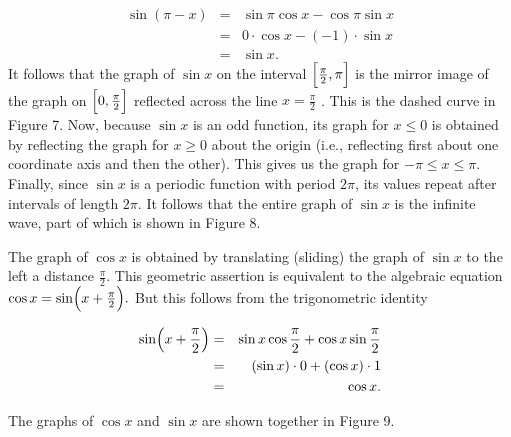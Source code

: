 \begin{eqnarray*}
\sin(\pi - x) &=& \sin \pi \cos x - \cos \pi \sin x \\
&=& 0 \cdot \cos x - (-1) \cdot \sin x \\
&=& \sin x.
\end{eqnarray*}
\noindent It follows that the graph of $\sin x$ on the interval $\Bigl[\frac{\pi}{2}, \pi \Bigr]$ is the mirror image of the graph on $\Bigl[0, \frac{\pi}{2} \Bigr]$ reflected across the line $x = \frac{\pi}{2}$ . This is the dashed curve in Figure 7. Now, because $\sin x$ is an odd function, its graph for $x \leq 0$ is obtained by reflecting the graph for $x \geq 0$ about the origin (i.e., reflecting first about one coordinate axis and then the other). This gives us the graph for $-\pi \leq x \leq \pi$.  Finally, since $\sin x$ is a periodic function with period $2\pi$, its values repeat after intervals of length $2\pi$. It follows that the entire graph of $\sin x$ is the infinite wave, part of which is shown in Figure 8.


The graph of $\cos x$ is obtained by translating (sliding) the graph of $\sin x$ to the left a distance $\frac{\pi}{2}$. This geometric assertion is equivalent to the algebraic equation $\cos x = \sin \Bigl(x + \frac{\pi}{2} \Bigr).$  But this follows from the trigonometric identity 

\begin{eqnarray*}
\sin \Bigl(x + \frac{\pi}{2} \Bigr) &=& \sin x \cos \frac{\pi}{2} + \cos x \sin \frac{\pi}{2}\\
&=& (\sin x) \cdot 0 + (\cos x) \cdot 1\\
&=& \cos x.
\end{eqnarray*}

The graphs of $\cos x$ and $\sin x$ are shown together in Figure 9.



